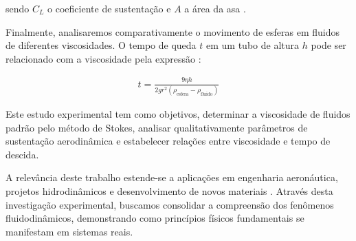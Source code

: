 sendo $C_L$ o coeficiente de sustentação e $A$ a área da asa \cite{moyses}.

Finalmente, analisaremos comparativamente o movimento de esferas em fluidos de diferentes viscosidades. O tempo de queda $t$ em um tubo de altura $h$ pode ser relacionado com a viscosidade pela expressão \cite{Munson2004-tl}:

\begin{align*}
       t = \frac{9\eta h}{2gr^2(\rho_{\text{esfera}} - \rho_{\text{fluido}})}
\end{align*}

Este estudo experimental tem como objetivos, determinar a viscosidade de fluidos padrão pelo método de Stokes, analisar qualitativamente parâmetros de sustentação aerodinâmica e estabelecer relações entre viscosidade e tempo de descida.

A relevância deste trabalho estende-se a aplicações em engenharia aeronáutica, projetos hidrodinâmicos e desenvolvimento de novos materiais \cite{araujo}. Através desta investigação experimental, buscamos consolidar a compreensão dos fenômenos fluidodinâmicos, demonstrando como princípios físicos fundamentais se manifestam em sistemas reais.
